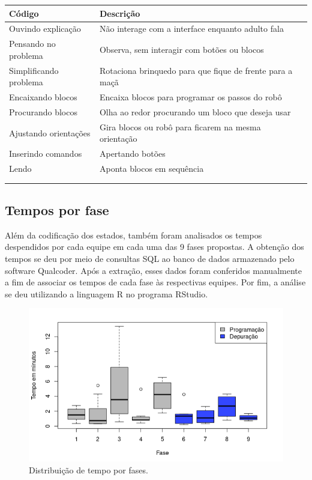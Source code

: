 \begin{quadro}[!h]
    \begin{table_env}
    \caption{}
     \label{quadro:codigos}
     \begin{tabular}{@{}l m{} c@{}}
        \toprule
        Código & Descrição  \\ \hline
        Ouvindo explicação & Não interage com a interface enquanto adulto fala \\ \hline
        Pensando no problema & Observa, sem interagir com botões ou blocos \\ \hline
        Simplificando problema & Rotaciona brinquedo para que fique de frente para a maçã \\ \hline
        Encaixando blocos & Encaixa blocos para programar os passos do robô \\ \hline
        Procurando blocos & Olha ao redor procurando um bloco que deseja usar \\ \hline
        Ajustando orientações & Gira blocos ou robô para ficarem na mesma orientação \\ \hline
        Inserindo comandos & Apertando botões  \\ \hline
        Lendo & Aponta blocos em sequência \\ \hline
        \\ \midrule
        \\ \bottomrule
        \end{tabular}
    \end{table_env}
    \sourceauthor
 \end{quadro}


 \subsection{Tempos por fase}

 Além da codificação dos estados, também foram analisados os tempos despendidos por cada equipe em cada uma das 9 fases propostas. A obtenção dos tempos se deu por meio de consultas SQL ao banco de dados armazenado pelo software Qualcoder. Após a extração, esses dados foram conferidos manualmente a fim de associar os tempos de cada fase às respectivas equipes. Por fim, a análise se deu utilizando a linguagem R no programa RStudio. 

 \begin{figure}[!htpb]
    \centering
    \includegraphics[width=.6\linewidth,fbox]{figs/tempos_por_tarefa.png}
    \caption{Distribuição de tempo por fases.}
    \sourceauthor
    \label{fig:tempo_tarefa}
\end{figure}

